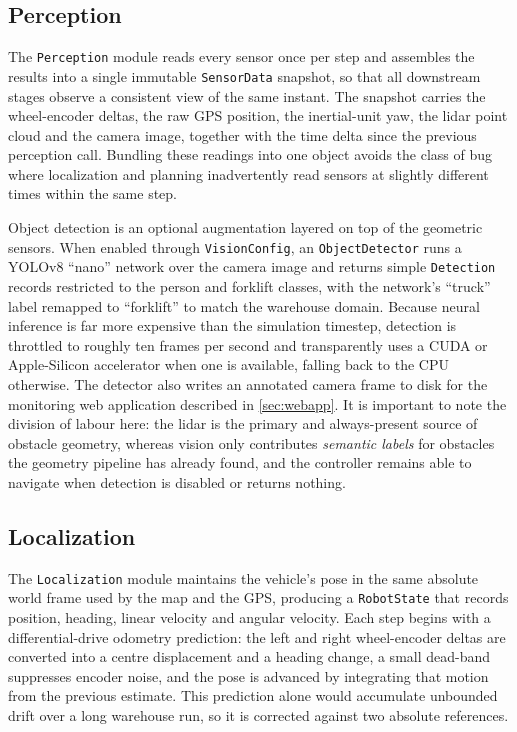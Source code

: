 \subsection{Perception}
\label{subsec:controllers-perception}

The \texttt{Perception} module reads every sensor once per step and assembles the results into a single immutable \texttt{SensorData} snapshot, so that all downstream stages observe a consistent view of the same instant. The snapshot carries the wheel-encoder deltas, the raw GPS position, the inertial-unit yaw, the lidar point cloud and the camera image, together with the time delta since the previous perception call. Bundling these readings into one object avoids the class of bug where localization and planning inadvertently read sensors at slightly different times within the same step.

Object detection is an optional augmentation layered on top of the geometric sensors. When enabled through \texttt{VisionConfig}, an \texttt{ObjectDetector} runs a YOLOv8 ``nano'' network over the camera image and returns simple \texttt{Detection} records restricted to the person and forklift classes, with the network's ``truck'' label remapped to ``forklift'' to match the warehouse domain. Because neural inference is far more expensive than the simulation timestep, detection is throttled to roughly ten frames per second and transparently uses a CUDA or Apple-Silicon accelerator when one is available, falling back to the CPU otherwise. The detector also writes an annotated camera frame to disk for the monitoring web application described in \cref{sec:webapp}. It is important to note the division of labour here: the lidar is the primary and always-present source of obstacle geometry, whereas vision only contributes \emph{semantic labels} for obstacles the geometry pipeline has already found, and the controller remains able to navigate when detection is disabled or returns nothing.

\subsection{Localization}
\label{subsec:controllers-localization}

The \texttt{Localization} module maintains the vehicle's pose in the same absolute world frame used by the map and the GPS, producing a \texttt{RobotState} that records position, heading, linear velocity and angular velocity. Each step begins with a differential-drive odometry prediction: the left and right wheel-encoder deltas are converted into a centre displacement and a heading change, a small dead-band suppresses encoder noise, and the pose is advanced by integrating that motion from the previous estimate. This prediction alone would accumulate unbounded drift over a long warehouse run, so it is corrected against two absolute references.

